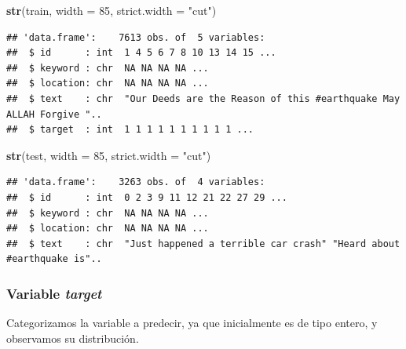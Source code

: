 \documentclass[
]{article}
\newenvironment{Shaded}{\begin{snugshade}}{\end{snugshade}}
\newcommand{\DataTypeTok}[1]{\textcolor[rgb]{0.13,0.29,0.53}{#1}}
\newcommand{\DecValTok}[1]{\textcolor[rgb]{0.00,0.00,0.81}{#1}}
\newcommand{\KeywordTok}[1]{\textcolor[rgb]{0.13,0.29,0.53}{\textbf{#1}}}
\newcommand{\NormalTok}[1]{#1}
\newcommand{\OperatorTok}[1]{\textcolor[rgb]{0.81,0.36,0.00}{\textbf{#1}}}
\newcommand{\StringTok}[1]{\textcolor[rgb]{0.31,0.60,0.02}{#1}}
\begin{document}
\begin{Shaded}
\begin{Highlighting}[]
\KeywordTok{str}\NormalTok{(train, }\DataTypeTok{width =} \DecValTok{85}\NormalTok{, }\DataTypeTok{strict.width =} \StringTok{"cut"}\NormalTok{)}
\end{Highlighting}
\end{Shaded}

\begin{verbatim}
## 'data.frame':    7613 obs. of  5 variables:
##  $ id      : int  1 4 5 6 7 8 10 13 14 15 ...
##  $ keyword : chr  NA NA NA NA ...
##  $ location: chr  NA NA NA NA ...
##  $ text    : chr  "Our Deeds are the Reason of this #earthquake May ALLAH Forgive "..
##  $ target  : int  1 1 1 1 1 1 1 1 1 1 ...
\end{verbatim}

\begin{Shaded}
\begin{Highlighting}[]
\KeywordTok{str}\NormalTok{(test, }\DataTypeTok{width =} \DecValTok{85}\NormalTok{, }\DataTypeTok{strict.width =} \StringTok{"cut"}\NormalTok{)}
\end{Highlighting}
\end{Shaded}

\begin{verbatim}
## 'data.frame':    3263 obs. of  4 variables:
##  $ id      : int  0 2 3 9 11 12 21 22 27 29 ...
##  $ keyword : chr  NA NA NA NA ...
##  $ location: chr  NA NA NA NA ...
##  $ text    : chr  "Just happened a terrible car crash" "Heard about #earthquake is"..
\end{verbatim}

\hypertarget{variable-target}{%
\subsubsection{\texorpdfstring{Variable
\emph{target}}{Variable target}}\label{variable-target}}

Categorizamos la variable a predecir, ya que inicialmente es de tipo
entero, y observamos su distribución.

\begin{Shaded}
\end{Shaded}
\end{document}
